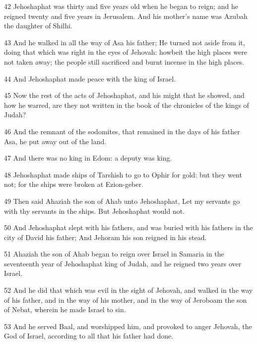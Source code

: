 \par 42 Jehoshaphat was thirty and five years old when he began to reign; and he reigned twenty and five years in Jerusalem. And his mother's name was Azubah the daughter of Shilhi.
\par 43 And he walked in all the way of Asa his father; He turned not aside from it, doing that which was right in the eyes of Jehovah: howbeit the high places were not taken away; the people still sacrificed and burnt incense in the high places.
\par 44 And Jehoshaphat made peace with the king of Israel.
\par 45 Now the rest of the acts of Jehoshaphat, and his might that he showed, and how he warred, are they not written in the book of the chronicles of the kings of Judah?
\par 46 And the remnant of the sodomites, that remained in the days of his father Asa, he put away out of the land.
\par 47 And there was no king in Edom: a deputy was king.
\par 48 Jehoshaphat made ships of Tarshish to go to Ophir for gold: but they went not; for the ships were broken at Ezion-geber.
\par 49 Then said Ahaziah the son of Ahab unto Jehoshaphat, Let my servants go with thy servants in the ships. But Jehoshaphat would not.
\par 50 And Jehoshaphat slept with his fathers, and was buried with his fathers in the city of David his father; And Jehoram his son reigned in his stead.
\par 51 Ahaziah the son of Ahab began to reign over Israel in Samaria in the seventeenth year of Jehoshaphat king of Judah, and he reigned two years over Israel.
\par 52 And he did that which was evil in the sight of Jehovah, and walked in the way of his father, and in the way of his mother, and in the way of Jeroboam the son of Nebat, wherein he made Israel to sin.
\par 53 And he served Baal, and worshipped him, and provoked to anger Jehovah, the God of Israel, according to all that his father had done.

